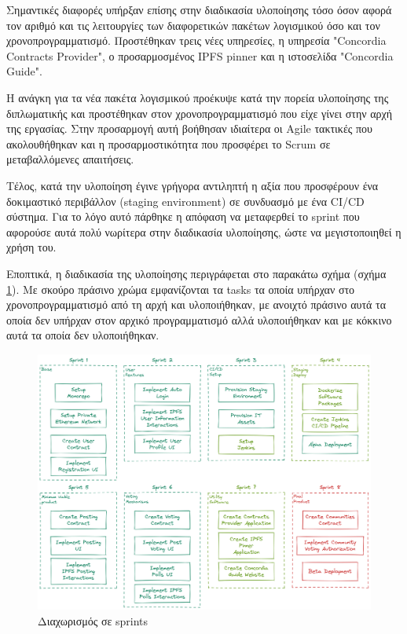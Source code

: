 Σημαντικές διαφορές υπήρξαν επίσης στην διαδικασία υλοποίησης τόσο όσον αφορά τον αριθμό και τις λειτουργίες των διαφορετικών πακέτων λογισμικού όσο και τον χρονοπρογραμματισμό. Προστέθηκαν τρεις νέες υπηρεσίες, η υπηρεσία "Concordia Contracts Provider", ο προσαρμοσμένος IPFS pinner και η ιστοσελίδα "Concordia Guide".

Η ανάγκη για τα νέα πακέτα λογισμικού προέκυψε κατά την πορεία υλοποίησης της διπλωματικής και προστέθηκαν στον χρονοπρογραμματισμό που είχε γίνει στην αρχή της εργασίας. Στην προσαρμογή αυτή βοήθησαν ιδιαίτερα οι Agile τακτικές που ακολουθήθηκαν και η προσαρμοστικότητα που προσφέρει το Scrum σε μεταβαλλόμενες απαιτήσεις.

Τέλος, κατά την υλοποίηση έγινε γρήγορα αντιληπτή η αξία που προσφέρουν ένα δοκιμαστικό περιβάλλον (staging environment) σε συνδυασμό με ένα CI/CD σύστημα. Για το λόγο αυτό πάρθηκε η απόφαση να μεταφερθεί το sprint που αφορούσε αυτά πολύ νωρίτερα στην διαδικασία υλοποίησης, ώστε να μεγιστοποιηθεί η χρήση του.

Εποπτικά, η διαδικασία της υλοποίησης περιγράφεται στο παρακάτω σχήμα (σχήμα \ref{figure:4.6.design-implementation-differences-sprints}). Με σκούρο πράσινο χρώμα εμφανίζονται τα tasks τα οποία υπήρχαν στο χρονοπρογραμματισμό από τη αρχή και υλοποιήθηκαν, με ανοιχτό πράσινο αυτά τα οποία δεν υπήρχαν στον αρχικό προγραμματισμό αλλά υλοποιήθηκαν και με κόκκινο αυτά τα οποία δεν υλοποιήθηκαν.

\begin{figure}[H]
    \centering
    \includegraphics[width=\textwidth]{assets/figures/chapter-4/4.6.design-implementation-differences-sprints.png}
    \caption{Διαχωρισμός σε sprints}
    \label{figure:4.6.design-implementation-differences-sprints}
\end{figure}
